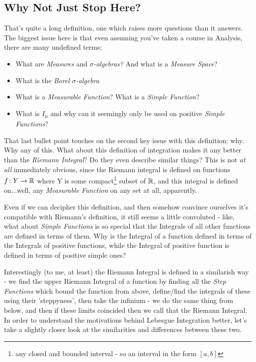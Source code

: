 \subsection{Why Not Just Stop Here?}
That's quite a long definition, one which raises more questions than it answers. The biggest issue here is that even assuming you've taken a course in Analysis, there are many undefined terms;
\begin{itemize}
	\item What are {\em Measures} and {\em $\sigma$-algebras?} And what is a {\em Measure Space}?
	\item What is the {\em Borel $\sigma$-algebra}
	\item What is a {\em Measurable Function\/}? What is a {\em Simple Function}?
	\item What is $I_\mu$ and why can it seemingly only be used on positive {\em Simple Functions}?
\end{itemize}

That last bullet point touches on the second key issue with this definition; why. Why any of this. What about this definition of integration makes it any better than the {\em Riemann Integral}? Do they even describe similar things? This is not {\em at all} immediately obvious, since the Riemann integral is defined on functions $f\colon Y \rightarrow \mathbb{R}$ where Y is some compact\footnote{any closed and bounded interval - so an interval in the form $[a, b]$} subset of $\mathbb{R}$, and this integral is defined on...well, any {\em Measurable Function} on any set at all, apparently.

Even if we can decipher this definition, and then somehow convince ourselves it's compatible with Riemann's definition, it still seems a little convoluted - like, what about \emph{Simple Functions} is so special that the Integrals of all other functions are defined in terms of them. Why is the Integral of a function defined in terms of the Integrals of positive functions, while the Integral of positive function is defined in terms of positive simple ones?

Interestingly (to me, at least) the Riemann Integral is defined in a similarish way - we find the upper Riemann Integral of a function by finding all the \emph{Step Functions} which bound the function from above, define/find the integrals of these using their 'steppyness', then take the infinium - we do the same thing from below, and then if these limits coincided then we call that the Riemann Integral. In order to understand the motivations behind Lebesgue Integration better, let's take a slightly closer look at the similarities and differences between these two.

